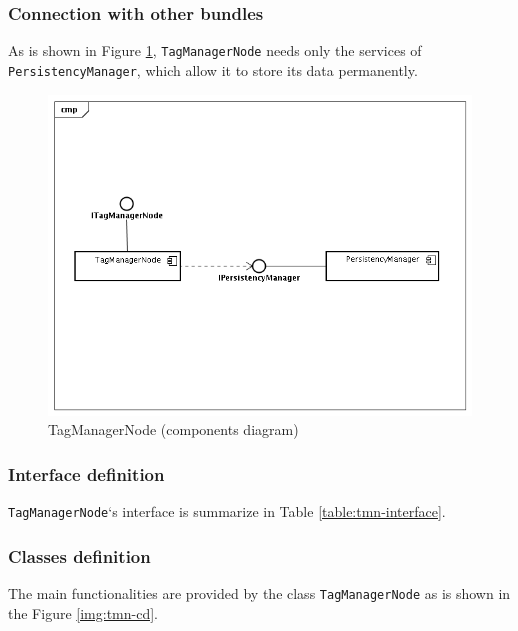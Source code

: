 \subsubsection{Connection with other bundles}
\label{subsubsec:connections-tmn}
As is shown in Figure \ref{img:tmn-components}, \verb|TagManagerNode| needs only
the services of \verb|PersistencyManager|, which allow it to store its data
permanently.

\begin{figure}[h!]
 \begin{center}
 \includegraphics[scale=0.4]{diagrams/TagManagerNodeComponentsDiagram.png}
  \caption{\label{img:tmn-components}TagManagerNode (components diagram)}
 \end{center}
\end{figure}

\subsubsection{Interface definition}
\label{subsubsec:tmn-interface-definition}

\verb|TagManagerNode|`s interface is summarize in Table
\ref{table:tmn-interface}.



\clearpage

\subsubsection{Classes definition}
The main functionalities are provided by the class \verb|TagManagerNode| as is
shown in the Figure \ref{img:tmn-cd}.


